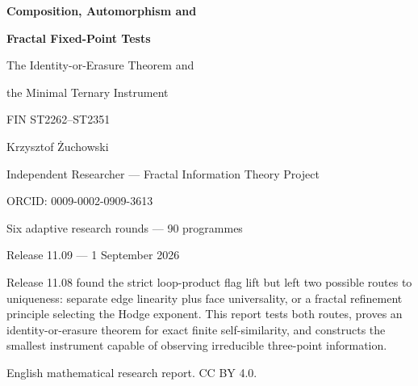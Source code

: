 \documentclass[11pt,a4paper]{article}
\begin{document}
\begin{titlepage}\centering\vspace*{13mm}
{\Huge\bfseries Composition, Automorphism and\par}\vspace{2mm}
{\Huge\bfseries Fractal Fixed-Point Tests\par}\vspace{5mm}
{\LARGE The Identity-or-Erasure Theorem and\par}\vspace{2mm}
{\LARGE the Minimal Ternary Instrument\par}\vspace{10mm}
{\Large FIN ST2262--ST2351\par}\vspace{8mm}
{\Large Krzysztof \.Zuchowski\par}
{\normalsize Independent Researcher --- Fractal Information Theory Project\par}
{\normalsize ORCID: 0009-0002-0909-3613\par}\vspace{8mm}
{\large Six adaptive research rounds --- 90 programmes\par}
{\large Release 11.09 --- 1 September 2026\par}
\vfill
\begin{minipage}{.88\textwidth}\small
Release 11.08 found the strict loop-product flag lift but left two possible
routes to uniqueness: separate edge linearity plus face universality, or a
fractal refinement principle selecting the Hodge exponent.  This report tests
both routes, proves an identity-or-erasure theorem for exact finite
self-similarity, and constructs the smallest instrument capable of observing
irreducible three-point information.
\end{minipage}\vfill
{\small English mathematical research report. CC BY 4.0.}
\end{titlepage}
\end{document}
